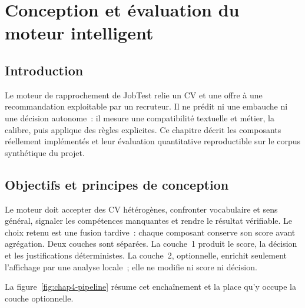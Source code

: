 \chapter{Conception et évaluation du moteur intelligent}
\label{chap:moteur-intelligent}
\newpage

\section*{Introduction}

Le moteur de rapprochement de JobTest relie un CV et une offre à une recommandation exploitable par un recruteur. Il ne prédit ni une embauche ni une décision autonome~: il mesure une compatibilité textuelle et métier, la calibre, puis applique des règles explicites. Ce chapitre décrit les composants réellement implémentés et leur évaluation quantitative reproductible sur le corpus synthétique du projet.

\section{Objectifs et principes de conception}

Le moteur doit accepter des CV hétérogènes, confronter vocabulaire et sens général, signaler les compétences manquantes et rendre le résultat vérifiable. Le choix retenu est une fusion tardive~: chaque composant conserve son score avant agrégation. Deux couches sont séparées. La couche~1 produit le score, la décision et les justifications déterministes. La couche~2, optionnelle, enrichit seulement l'affichage par une analyse locale~; elle ne modifie ni score ni décision.

La figure~\ref{fig:chap4-pipeline} résume cet enchaînement et la place qu'y occupe la couche optionnelle.

